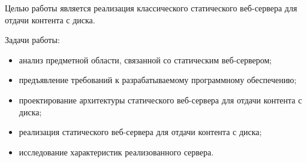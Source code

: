 
Целью работы является реализация классического статического веб-сервера для отдачи контента с диска.

Задачи работы:
\begin{itemize}
	\item анализ предметной области, связанной со статическим веб-сервером;
	\item предъявление требований к разрабатываемому программному обеспечению;
	\item проектирование архитектуры статического веб-сервера для отдачи контента с диска;
	\item реализация статического веб-сервера для отдачи контента с диска;
	\item исследование характеристик реализованного сервера.
\end{itemize}

\clearpage
